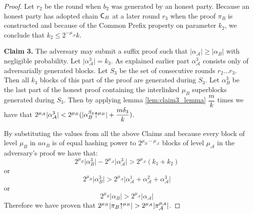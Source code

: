 \begin{proof}
Let $r_2$ be the round when $b_2$ was generated by an honest party. Because an honest party has adopted chain $\mathsf{C}_B$ at a later round $r_3$ when the proof $\pi_B$ is constructed and because of the Common Prefix property on parameter $k_2$, we conclude that $k_2 \leq 2^{-\mu_\mathcal{A}}k$.

\textbf{Claim 3.} The adversary may submit a suffix proof such that $\lvert \alpha_\mathcal{A}\rvert \geq \lvert \alpha_B \rvert$ with negligible probability. Let $ \lvert \alpha_\mathcal{A}^3 \rvert = k_3$. As explained earlier part $\alpha^3_\mathcal{A}$ consists only of adversarially generated blocks. Let $S_3$ be the set of consecutive rounds $r_2...r_3$. Then all $k_3$ blocks of this part of the proof are generated during $S_3$. Let $\alpha^{3}_B$ be the last part of the honest proof containing the interlinked $\mu_B$ superblocks generated during $S_3$. Then by applying lemma \ref{lem:claim3_lemma} $\dfrac{m}{k}$ times we have that $ 2^{\mu_\mathcal{A}}\lvert \alpha^3_\mathcal{A} \rvert < 2^{\mu_B} (\lvert \alpha^{S_3}_{B}\negthickspace\uparrow^{\mu_B} \rvert + \dfrac{m\delta_3}{k})$.

By substituting the values from all the above Claims and because every block of level $\mu_B$ in $a\alpha_B$ is of equal hashing power to $2^{\mu_B - \mu_\mathcal{A}}$ blocks of level $\mu_\mathcal{A}$ in the adversary's proof we have that:
\begin{equation*}
    2^{\mu_B} \lvert \alpha{_B^{3}} \rvert - 2^{\mu_\mathcal{A}} \lvert \alpha_\mathcal{A}^{3} \rvert > 2^{\mu_\mathcal{A}}(k_1 + k_2)
\end{equation*} or
\begin{equation*}
    2^{\mu_B} \lvert \alpha{_B^{3}} \rvert > 2^{\mu_\mathcal{A}} \lvert \alpha_\mathcal{A}^{1} + \alpha_\mathcal{A}^{2} + \alpha_\mathcal{A}^{3}\rvert
\end{equation*} or
\begin{equation*}
    2^{\mu_B} \lvert \alpha{_B} \rvert > 2^{\mu_\mathcal{A}} \lvert \alpha_\mathcal{A} \rvert
\end{equation*}
Therefore we have proven that $2^{\mu_B} \lvert \pi_B \negthickspace\uparrow^{\mu_B} \rvert > 2^{\mu_\mathcal{A}} \lvert \pi_\mathcal{A}^{\mu_\mathcal{A}} \rvert$.
\end{proof}